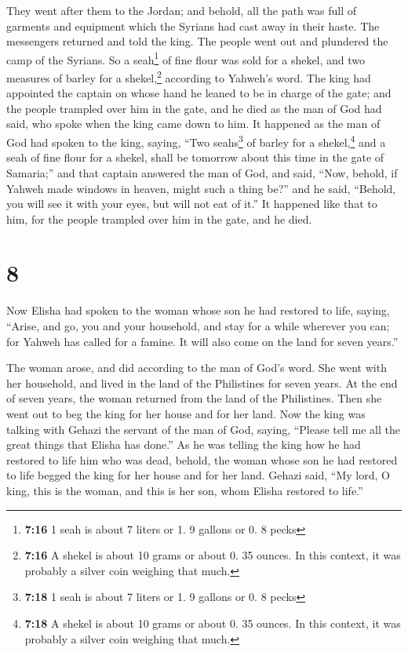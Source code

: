  They went after them to the Jordan; and behold, all the
path was full of garments and equipment which the Syrians had cast away
in their haste. The messengers returned and told the king.
 The people went out and plundered the camp of the
Syrians. So a seah\footnote{\textbf{7:16} 1 seah is about 7 liters or 1.
  9 gallons or 0. 8 pecks} of fine flour was sold for a shekel, and two
measures of barley for a shekel,\footnote{\textbf{7:16} A shekel is
  about 10 grams or about 0. 35 ounces. In this context, it was probably
  a silver coin weighing that much.} according to Yahweh's word.
 The king had appointed the captain on whose hand he
leaned to be in charge of the gate; and the people trampled over him in
the gate, and he died as the man of God had said, who spoke when the
king came down to him.  It happened as the man of God had
spoken to the king, saying, ``Two seahs\footnote{\textbf{7:18} 1 seah is
  about 7 liters or 1. 9 gallons or 0. 8 pecks} of barley for a
shekel,\footnote{\textbf{7:18} A shekel is about 10 grams or about 0. 35
  ounces. In this context, it was probably a silver coin weighing that
  much.} and a seah of fine flour for a shekel, shall be tomorrow about
this time in the gate of Samaria;''  and that captain
answered the man of God, and said, ``Now, behold, if Yahweh made windows
in heaven, might such a thing be?'' and he said, ``Behold, you will see
it with your eyes, but will not eat of it.''  It happened
like that to him, for the people trampled over him in the gate, and he
died.

\hypertarget{section-7}{%
\section{8}\label{section-7}}

 Now Elisha had spoken to the woman whose son he had
restored to life, saying, ``Arise, and go, you and your household, and
stay for a while wherever you can; for Yahweh has called for a famine.
It will also come on the land for seven years.''

 The woman arose, and did according to the man of God's
word. She went with her household, and lived in the land of the
Philistines for seven years.  At the end of seven years,
the woman returned from the land of the Philistines. Then she went out
to beg the king for her house and for her land.  Now the
king was talking with Gehazi the servant of the man of God, saying,
``Please tell me all the great things that Elisha has done.''
 As he was telling the king how he had restored to life
him who was dead, behold, the woman whose son he had restored to life
begged the king for her house and for her land. Gehazi said, ``My lord,
O king, this is the woman, and this is her son, whom Elisha restored to
life.''

